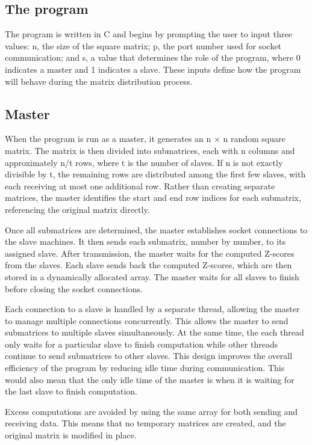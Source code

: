 \documentclass[journal]{./IEEE/IEEEtran}
\begin{document}
\subsection{The program}
The program is written in C and begins by prompting the user to input three values: n, the size of the square matrix; p, the port number used for socket communication; and s, a value that determines the role of the program, where 0 indicates a master and 1 indicates a slave. These inputs define how the program will behave during the matrix distribution process.



\subsection{Master}
When the program is run as a master, it generates an n × n random square matrix. The matrix is then divided into submatrices, each with n columns and approximately n/t rows, where t is the number of slaves. If n is not exactly divisible by t, the remaining rows are distributed among the first few slaves, with each receiving at most one additional row. Rather than creating separate matrices, the master identifies the start and end row indices for each submatrix, referencing the original matrix directly.

Once all submatrices are determined, the master establishes socket connections to the slave machines. It then sends each submatrix, number by number, to its assigned slave. After transmission, the master waits for the computed Z-scores from the slaves. Each slave sends back the computed Z-scores, which are then stored in a dynamically allocated array. The master waits for all slaves to finish before closing the socket connections.

Each connection to a slave is handled by a separate thread, allowing the master to manage multiple connections concurrently. This allows the master to send submatrices to multiple slaves simultaneously. At the same time, the each thread only waits for a particular slave to finish computation while other threads continue to send submatrices to other slaves. This design improves the overall efficiency of the program by reducing idle time during communication. This would also mean that the only idle time of the master is when it is waiting for the last slave to finish computation.

Excess computations are avoided by using the same array for both sending and receiving data. This means that no temporary matrices are created, and the original matrix is modified in place. 
\end{document}
